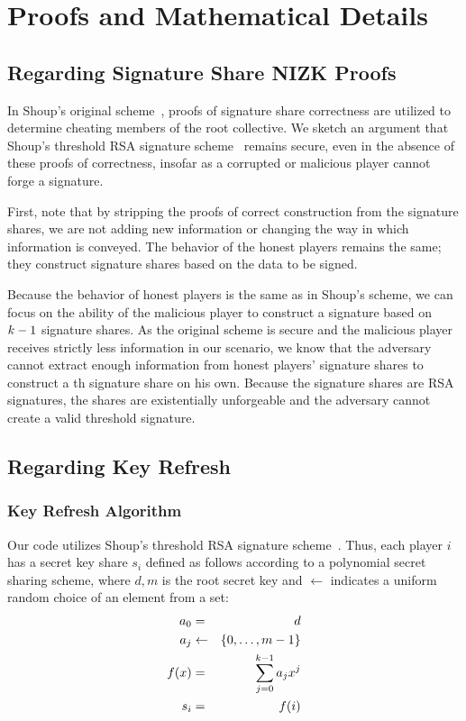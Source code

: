 \section{Proofs and Mathematical Details}

\subsection{Regarding Signature Share NIZK Proofs}
\label{sec:proof-sigshare}

In Shoup's original scheme~\cite{shoup-sig}, proofs of signature share correctness are utilized to determine
cheating members of the root collective. We sketch an argument that
Shoup's threshold RSA signature scheme~\cite{shoup-sig} remains
secure, even in the absence of these proofs of correctness, insofar as
a corrupted or malicious player cannot forge a signature.

First, note that by stripping the proofs of correct construction from
the signature shares, we are not adding new information or changing
the way in which information is conveyed. The behavior of the honest
players remains the same; they construct signature shares based on the
data to be signed. 

Because the behavior of honest players is the same as in Shoup's
scheme, we can focus on the ability of the malicious player to
construct a signature based on $k-1$ signature shares. As the
original scheme is secure and the malicious player receives strictly
less information in our scenario, we know that the adversary cannot
extract enough information from honest players' signature shares to
construct a \nums th signature share on his own. Because the signature
shares are RSA signatures, the shares are existentially unforgeable
and the adversary cannot create a valid threshold signature.


\subsection{Regarding Key Refresh}
\label{sec:proof-refresh}

\subsubsection{Key Refresh Algorithm}

Our code utilizes Shoup's threshold RSA signature
scheme~\cite{shoup-sig}. Thus, each player $i$ has a secret key share
$s_i$ defined as follows according to a polynomial secret sharing
scheme, where $d,m$ is the root secret key and $\leftarrow$ indicates
a uniform random choice of an element from a set:
\begin{eqnarray*}
a_0 & = & d \\
a_j & \leftarrow & \{ 0, \dots, m-1\} \\
f(x) & = & \sum_{j=0}^{k-1} a_j x^j \\
s_i & = & f(i)
\end{eqnarray*}

